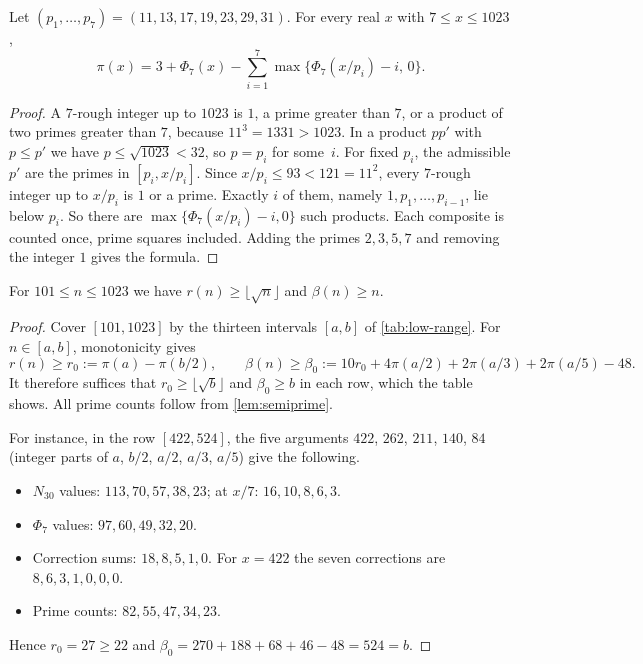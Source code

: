 \begin{lemma}\label{lem:semiprime}
Let $(p_1,\dots,p_7)=(11,13,17,19,23,29,31)$. For every real $x$ with $7\le x\le1023$,
\[
 \pi(x)=3+\Phi_7(x)-\sum_{i=1}^{7}\max\{\Phi_7(x/p_i)-i,\,0\}.
\]
\end{lemma}

\begin{proof}
A $7$-rough integer up to $1023$ is $1$, a prime greater than $7$, or a product of two primes greater than $7$, because $11^3=1331>1023$. In a product $pp'$ with $p\le p'$ we have $p\le\sqrt{1023}<32$, so $p=p_i$ for some~$i$. For fixed $p_i$, the admissible $p'$ are the primes in $[p_i,x/p_i]$. Since $x/p_i\le93<121=11^2$, every $7$-rough integer up to $x/p_i$ is $1$ or a prime. Exactly $i$ of them, namely $1,p_1,\dots,p_{i-1}$, lie below $p_i$. So there are $\max\{\Phi_7(x/p_i)-i,0\}$ such products. Each composite is counted once, prime squares included. Adding the primes $2,3,5,7$ and removing the integer $1$ gives the formula.
\end{proof}

\begin{proposition}\label{prop:101-1023}
For $101\le n\le1023$ we have $r(n)\ge\lfloor\sqrt n\rfloor$ and $\beta(n)\ge n$.
\end{proposition}

\begin{proof}
Cover $[101,1023]$ by the thirteen intervals $[a,b]$ of \cref{tab:low-range}. For $n\in[a,b]$, monotonicity gives
\[
 r(n)\ge r_0:=\pi(a)-\pi(b/2),
 \qquad
 \beta(n)\ge\beta_0:=10r_0+4\pi(a/2)+2\pi(a/3)+2\pi(a/5)-48 .
\]
It therefore suffices that $r_0\ge\lfloor\sqrt b\rfloor$ and $\beta_0\ge b$ in each row, which the table shows. All prime counts follow from \cref{lem:semiprime}.

For instance, in the row $[422,524]$, the five arguments $422$, $262$, $211$, $140$, $84$ (integer parts of $a$, $b/2$, $a/2$, $a/3$, $a/5$) give the following.
\begin{itemize}
\item $N_{30}$ values: $113,70,57,38,23$; at $x/7$: $16,10,8,6,3$.
\item $\Phi_7$ values: $97,60,49,32,20$.
\item Correction sums: $18,8,5,1,0$. For $x=422$ the seven corrections are $8,6,3,1,0,0,0$.
\item Prime counts: $82,55,47,34,23$.
\end{itemize}
Hence $r_0=27\ge22$ and $\beta_0=270+188+68+46-48=524=b$.
\end{proof}

